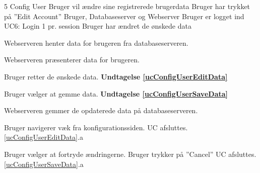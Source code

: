 \uchead
	{5} %
	{Config User} %
	{Bruger vil ændre sine registrerede brugerdata} %
	{Bruger har trykket på ''Edit Account''} %
	{Bruger, Databaseserver og Webserver} %
	{Bruger er logget ind}
	{UC6: Login} %
	{1 pr. session} %
	{Bruger har ændret de ønskede data} %


\item\label{ucConfigUserPresentData} Webserveren henter data for brugeren fra databaseserveren.

\item Webserveren præsenterer data for brugeren.

\item\label{ucConfigUserEditData} Bruger retter de ønskede data. \textbf{Undtagelse \ref{ucConfigUserEditData}}

\item\label{ucConfigUserSaveData} Bruger vælger at gemme data. \textbf{Undtagelse \ref{ucConfigUserSaveData}}

\item Webserveren gemmer de opdaterede data på databaseserveren.



\ucdescriptionend %

\ucextension
	{Bruger navigerer væk fra konfigurationssiden.}
	{UC afsluttes.}
	{\ref{ucConfigUserEditData}.a}

\ucextension
	{Bruger vælger at fortryde ændringerne.}
	{Bruger trykker på ''Cancel'' \newline
	UC afsluttes.}
	{\ref{ucConfigUserSaveData}.a}

